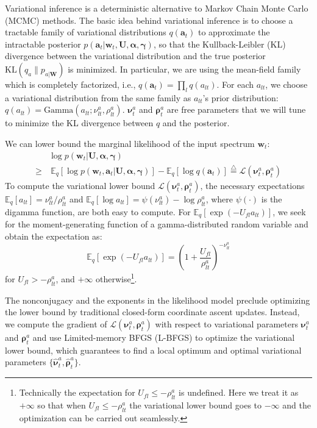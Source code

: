 \documentclass{article} %
\begin{document}
Variational inference is a deterministic alternative to Markov Chain Monte Carlo (MCMC) methods.  The basic idea behind variational
inference is to choose a tractable family of variational distributions
$q(\bm{a}_t)$ to approximate the intractable posterior $p(\bm{a}_t |
\bm{w}_t, \mathbf{U}, \bm{\alpha}, \bm{\gamma})$, so that the
Kullback-Leibler (KL) divergence between the variational distribution and
the true posterior $\text{KL}(q_a \| p_{a|\mathbf{W}})$ is
minimized. In particular, we are using the mean-field family which is
completely factorized, i.e., $q(\bm{a}_t) = \prod_l q(a_{lt})$. For
each $a_{lt}$, we choose a variational distribution from
the same family as $a_{lt}$'s prior distribution: $q(a_{lt}) =
\text{Gamma}(a_{lt}; \nu_{lt}^a, \rho_{lt}^a)$. $\bm{\nu}^a_t$ and
$\bm{\rho}^a_t$ are free parameters that we will tune to minimize the
KL divergence between $q$ and the posterior.

We can lower bound the marginal likelihood of the input spectrum $\bm{w}_t$: 
\begin{align} \label{eq:lbound}
&\log p(\bm{w}_t | \mathbf{U}, \bm{\alpha}, \bm{\gamma})\nonumber \\ 
\geq &~\mathbb{E}_q [\log p(\bm{w}_t, \bm{a}_t| \mathbf{U}, \bm{\alpha}, \bm{\gamma})] - \mathbb{E}_q [\log q(\bm{a}_t)] \overset{\bigtriangleup}{=} \mathcal{L}(\bm{\nu}^a_t, \bm{\rho}^a_t)
\end{align}
To compute the variational lower bound $\mathcal{L}(\bm{\nu}^a_t, \bm{\rho}^a_t)$, the necessary expectations $\mathbb{E}_q[a_{lt}] = \nu_{lt}^a / \rho_{lt}^a$ and $\mathbb{E}_q[\log a_{lt}] =  \psi(\nu_{lt}^a) - \log \rho_{lt}^a$, where $\psi(\cdot)$ is the digamma function, are both easy to compute. For $\mathbb{E}_q[\exp(-U_{fl} a_{lt})]$, we seek for the moment-generating function of a gamma-distributed random variable and obtain the expectation as:
\begin{equation}
\mathbb{E}_q[\exp(-U_{fl} a_{lt})] = \left(1 + \textstyle{\frac{U_{fl}}{\rho^a_{lt}}}\right)^{-\nu_{lt}^a}
\end{equation}
for $U_{fl} > -\rho_{lt}^a$, and $+\infty$ otherwise\footnote{Technically the expectation for $U_{fl} \leq -\rho_{lt}^a$ is undefined. Here we treat it as $+\infty$ so that when $U_{fl} \le -\rho_{lt}^a$ the variational lower bound goes to $-\infty$ and the optimization can be carried out seamlessly.}.

The nonconjugacy and the exponents in the likelihood model preclude optimizing the lower bound by traditional closed-form coordinate ascent updates. Instead, we compute the gradient of $\mathcal{L}(\bm{\nu}^a_t, \bm{\rho}^a_t)$ with respect to variational parameters $\bm{\nu}_{t}^a$ and $\bm{\rho}_{t}^a$ and use Limited-memory BFGS (L-BFGS) to optimize the variational lower bound, which guarantees to find a local optimum and optimal variational parameters $\{\hat{\bm{\nu}}_t^{a}, \hat{\bm{\rho}}_t^{a}\}$. 
\end{document}
